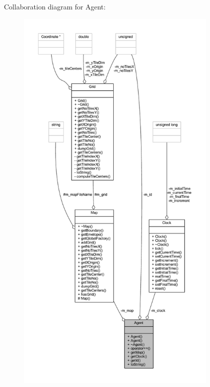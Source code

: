 Collaboration diagram for Agent\+:
\nopagebreak
\begin{figure}[H]
\begin{center}
\leavevmode
\includegraphics[height=550pt]{class_agent__coll__graph}
\end{center}
\end{figure}
